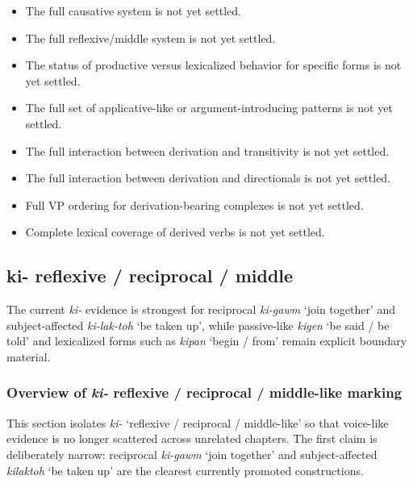 \documentclass[
  11pt,
  a4paper,
]{article}
\providecommand{\tightlist}{%
  \setlength{\itemsep}{0pt}\setlength{\parskip}{0pt}}
\newcommand{\tdim}[1]{\textit{#1}}
\newcommand{\glossquote}[1]{`#1'}
\begin{document}
\begin{itemize}
\tightlist
\item
  The full causative system is not yet settled.
\item
  The full reflexive/middle system is not yet settled.
\item
  The status of productive versus lexicalized behavior for specific
  forms is not yet settled.
\item
  The full set of applicative-like or argument-introducing patterns is
  not yet settled.
\item
  The full interaction between derivation and transitivity is not yet
  settled.
\item
  The full interaction between derivation and directionals is not yet
  settled.
\item
  Full VP ordering for derivation-bearing complexes is not yet settled.
\item
  Complete lexical coverage of derived verbs is not yet settled.
\end{itemize}

\subsection{ki- reflexive / reciprocal /
middle}\label{ki--reflexive-reciprocal-middle}

The current \tdim{ki-} evidence is strongest for reciprocal
\tdim{ki-gawm} \glossquote{join together} and subject-affected
\tdim{ki-lak-toh} \glossquote{be taken up}, while passive-like
\tdim{kigen} \glossquote{be said / be told} and lexicalized forms such
as \tdim{kipan} \glossquote{begin / from} remain explicit boundary
material.

\subsubsection{\texorpdfstring{Overview of \tdim{ki-} reflexive /
reciprocal / middle-like
marking}{Overview of  reflexive / reciprocal / middle-like marking}}\label{overview-of-reflexive-reciprocal-middle-like-marking}

This section isolates \tdim{ki-}
\glossquote{reflexive / reciprocal / middle-like} so that voice-like
evidence is no longer scattered across unrelated chapters. The first
claim is deliberately narrow: reciprocal \tdim{ki-gawm}
\glossquote{join together} and subject-affected \tdim{kilaktoh}
\glossquote{be taken up} are the clearest currently promoted
constructions.
\end{document}
